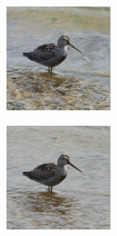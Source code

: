 \documentclass{article}
\begin{document}
\begin{figure}
\begin{subfigure}[b]{0.5\linewidth}
\begin{subfigure}[b]{0.242\linewidth}
        \end{subfigure}
        \begin{subfigure}[b]{0.242\linewidth}
        \includegraphics[width=\linewidth]{figures/imagenet128/solver_samples/imagenet128_fm_ot_273_20.png}
        \end{subfigure}
        \begin{subfigure}[b]{0.242\linewidth}
        \includegraphics[width=\linewidth]{figures/imagenet128/solver_samples/imagenet128_fm_ot_273_50.png}
        \end{subfigure}
    \end{subfigure}\\
    

\end{figure}
\end{document}
